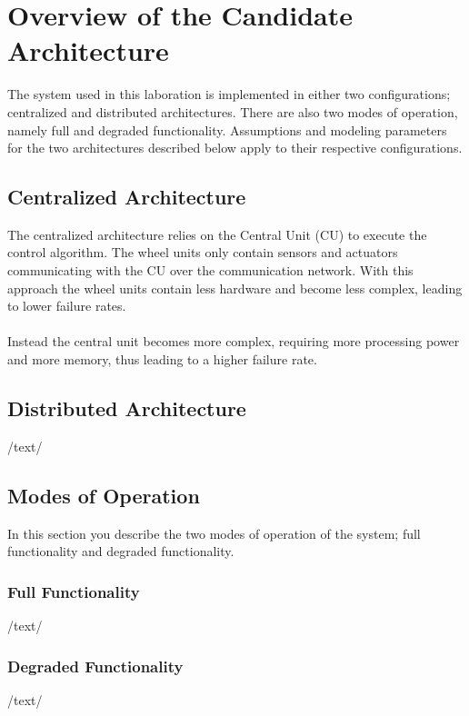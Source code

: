 
\newpage
\section{Overview of the Candidate Architecture}
The system used in this laboration is implemented in either two configurations; centralized and distributed architectures. There are also two modes of operation, namely full and degraded functionality. Assumptions and modeling parameters for the two architectures described below apply to their respective configurations.

\subsection{Centralized Architecture}
The centralized architecture relies on the Central Unit (CU) to execute the control algorithm. The wheel units only contain sensors and actuators communicating with the CU over the communication network. With this approach the wheel units contain less hardware and become less complex, leading to lower failure rates.\\
\\
Instead the central unit becomes more complex, requiring more processing power and more memory, thus leading to a higher failure rate.
\subsection{Distributed Architecture}
/text/
\subsection{Modes of Operation}
In this section you describe the two modes of operation of the system; full functionality and degraded functionality.
\subsubsection{Full Functionality}
/text/
\subsubsection{Degraded Functionality}
/text/
